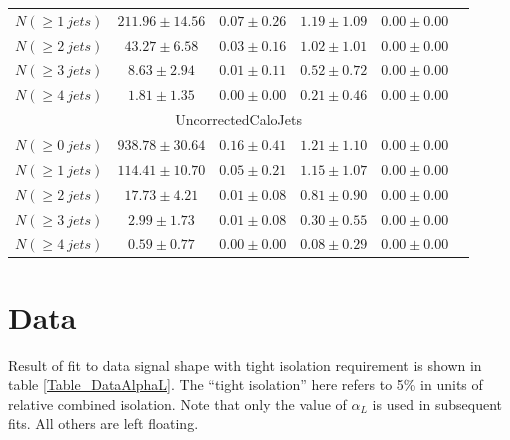 \documentclass{cmspaper}
\begin{document}
\begin{table}[htdp]
\begin{tabular}{|c|c|c|c|c|c|}
       $N(\geq 1~jets)$       & $ 211.96 \pm 14.56 $ & $ 0.07 \pm 0.26 $ & $ 1.19 \pm 1.09 $ & $ 0.00 \pm 0.00 $ \\
       $N(\geq 2~jets)$       & $ 43.27 \pm 6.58 $ & $ 0.03 \pm 0.16 $ & $ 1.02 \pm 1.01 $ & $ 0.00 \pm 0.00 $ \\
       $N(\geq 3~jets)$       & $ 8.63 \pm 2.94 $ & $ 0.01 \pm 0.11 $ & $ 0.52 \pm 0.72 $ & $ 0.00 \pm 0.00 $ \\
       $N(\geq 4~jets)$       & $ 1.81 \pm 1.35 $ & $ 0.00 \pm 0.00 $ & $ 0.21 \pm 0.46 $ & $ 0.00 \pm 0.00 $ \\
       \hline
       \multicolumn{6}{|c|}{UncorrectedCaloJets} \\
       \hline
       $N(\geq 0~jets)$       & $ 938.78 \pm 30.64 $ & $ 0.16 \pm 0.41 $ & $ 1.21 \pm 1.10 $ & $ 0.00 \pm 0.00 $ \\
       $N(\geq 1~jets)$       & $ 114.41 \pm 10.70 $ & $ 0.05 \pm 0.21 $ & $ 1.15 \pm 1.07 $ & $ 0.00 \pm 0.00 $ \\
       $N(\geq 2~jets)$       & $ 17.73 \pm 4.21 $ & $ 0.01 \pm 0.08 $ & $ 0.81 \pm 0.90 $ & $ 0.00 \pm 0.00 $ \\
       $N(\geq 3~jets)$       & $ 2.99 \pm 1.73 $ & $ 0.01 \pm 0.08 $ & $ 0.30 \pm 0.55 $ & $ 0.00 \pm 0.00 $ \\
       $N(\geq 4~jets)$       & $ 0.59 \pm 0.77 $ & $ 0.00 \pm 0.00 $ & $ 0.08 \pm 0.29 $ & $ 0.00 \pm 0.00 $ \\
       \hline
       \end{tabular}
   \label{Table_MCSignalShape}
\end{table}

\section{Data}


Result of fit to data signal shape with tight isolation requirement is shown in table \ref{Table_DataAlphaL}.
The ``tight isolation'' here refers to 5\% in units of relative combined isolation.
Note that only the value of $\alpha_L$ is used in subsequent fits.  All others are left floating.
\end{document}
